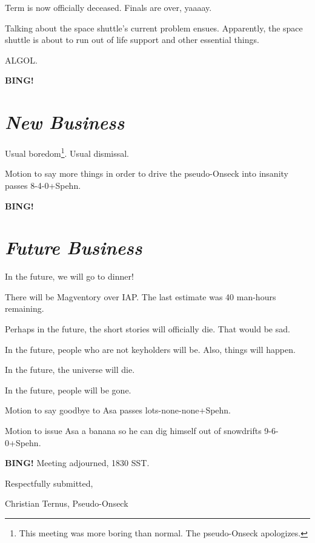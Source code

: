 \documentclass[10pt]{article}
\newcommand{\bing}{{\bf BING!} }
\newcommand{\goto}[1]{\bing \vskip 12pt \section*{{\em{#1}}}}
\begin{document}
Term is now officially deceased.  Finals are over, yaaaay.

Talking about the space shuttle's current problem ensues.  Apparently, the space shuttle is about to run out of life support and other essential things.

ALGOL.

\goto{New Business}

Usual boredom\footnote[1]{This meeting was more boring than normal. The pseudo-Onseck apologizes.}. Usual dismissal.

Motion to say more things in order to drive the pseudo-Onseck into insanity passes 8-4-0+Spehn.

\goto{Future Business}

In the future, we will go to dinner!

There will be Magventory over IAP.  The last estimate was 40 man-hours remaining. 

Perhaps in the future, the short stories will officially die.  That would be sad.

In the future, people who are not keyholders will be.  Also, things will happen.

In the future, the universe will die.  

In the future, people will be gone.

Motion to say goodbye to Asa passes lots-none-none+Spehn.

Motion to issue Asa a banana so he can dig himself out of snowdrifts 9-6-0+Spehn.

\bing
\noindent
Meeting adjourned, 1830 SST.

\vspace{18pt}

\centerline{Respectfully submitted,}
\centerline{Christian Ternus, Pseudo-Onseck}
\end{document}
